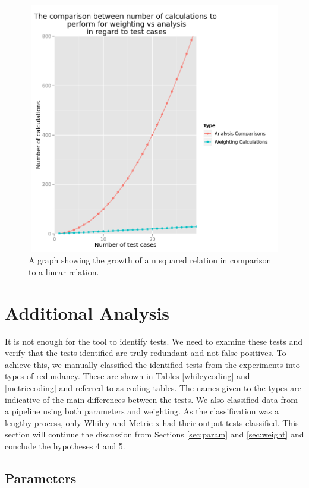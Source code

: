 \begin{figure}[h]
\begin{center}
\includegraphics[height=11cm, width = 15.5cm]{plotgraph.png}
\end{center}
\caption{A graph showing the growth of a n squared relation in comparison to a linear relation.}
\label{fig:plotgraph}
\end{figure}

\section{Additional Analysis}
\label{addAnaly}
It is not enough for the tool to identify tests. We need to examine these tests and verify that the tests identified are truly redundant and not false positives. To achieve this, we manually classified the identified tests from the experiments into types of redundancy. These are shown in Tables \ref{whileycoding} and \ref{metriccoding} and referred to as coding tables. The names given to the types are indicative of the main differences between the tests. We also classified data from a pipeline using both parameters and weighting. As the classification was a lengthy process, only Whiley and Metric-x had their output tests classified. This section will continue the discussion from Sections \ref{sec:param} and \ref{sec:weight} and conclude the hypotheses 4 and 5.

\subsection{Parameters}

